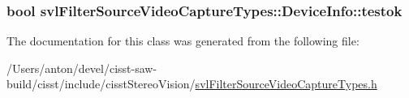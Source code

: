 \subsubsection[{testok}]{\setlength{\rightskip}{0pt plus 5cm}bool svl\+Filter\+Source\+Video\+Capture\+Types\+::\+Device\+Info\+::testok}\label{classsvl_filter_source_video_capture_types_1_1_device_info_a1ccd6cfa9057071df17b79bac2624c23}


The documentation for this class was generated from the following file\+:\begin{DoxyCompactItemize}
\item 
/\+Users/anton/devel/cisst-\/saw-\/build/cisst/include/cisst\+Stereo\+Vision/\hyperlink{svl_filter_source_video_capture_types_8h}{svl\+Filter\+Source\+Video\+Capture\+Types.\+h}\end{DoxyCompactItemize}
